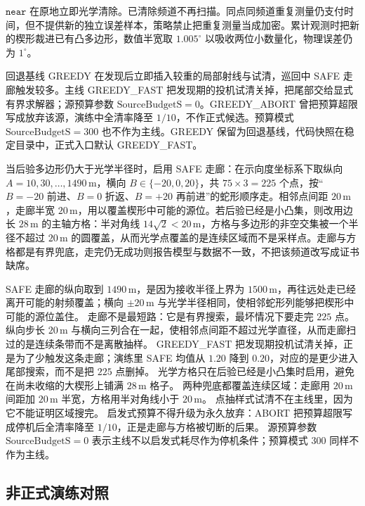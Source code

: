 $\mathtt{near}$ 在原地立即光学清除。已清除频道不再扫描。同点同频道重复测量仍支付时间，但不提供新的独立误差样本，策略禁止把重复测量当成加密。累计观测时把新的楔形裁进已有凸多边形，数值半宽取 $1.005^\circ$ 以吸收两位小数量化，物理误差仍为 $1^\circ$。

回退基线 GREEDY 在发现后立即插入较重的局部射线与试清，巡回中 SAFE 走廊触发较多。主线 GREEDY\_FAST 把发现期的投机试清关掉，把尾部交给显式有界求解器；源预算参数 $\mathrm{SourceBudgetS}=0$。GREEDY\_ABORT 曾把预算超限写成放弃该源，演练中全清率降至 $1/10$，不作正式候选。预算模式 $\mathrm{SourceBudgetS}=300$ 也不作为主线。GREEDY 保留为回退基线，代码快照在稳定目录中，正式入口默认 GREEDY\_FAST。

当后验多边形仍大于光学半径时，启用 SAFE 走廊：在示向度坐标系下取纵向 $A=10,30,\ldots,1490\,\mathrm{m}$，横向 $B\in\{-20,0,20\}$，共 $75\times 3=225$ 个点，按“$B=-20$ 前进、$B=0$ 折返、$B=+20$ 再前进”的蛇形顺序走。相邻点间距 $20\,\mathrm{m}$，走廊半宽 $20\,\mathrm{m}$，用以覆盖楔形中可能的源位。若后验已经是小凸集，则改用边长 $28\,\mathrm{m}$ 的主轴方格：半对角线 $14\sqrt{2}<20\,\mathrm{m}$，方格与多边形的非空交集被一个半径不超过 $20\,\mathrm{m}$ 的圆覆盖，从而光学点覆盖的是连续区域而不是采样点。走廊与方格都是有界兜底，走完仍无成功则报告模型与数据不一致，不把该频道改写成证书缺席。

SAFE 走廊的纵向取到 $1490\,\mathrm{m}$，是因为接收半径上界为 $1500\,\mathrm{m}$，再往远处走已经离开可能的射频覆盖；横向 $\pm 20\,\mathrm{m}$ 与光学半径相同，使相邻蛇形列能够把楔形中可能的源位盖住。
走廊不是最短路：它是有界搜索，最坏情况下要走完 $225$ 点。
纵向步长 $20\,\mathrm{m}$ 与横向三列合在一起，使相邻点间距不超过光学直径，从而走廊扫过的是连续条带而不是离散抽样。
GREEDY\_FAST 把发现期投机试清关掉，正是为了少触发这条走廊；演练里 SAFE 均值从 $1.20$ 降到 $0.20$，对应的是更少进入尾部搜索，而不是把 $225$ 点删掉。
光学方格只在后验已经是小凸集时启用，避免在尚未收缩的大楔形上铺满 $28\,\mathrm{m}$ 格子。
两种兜底都覆盖连续区域：走廊用 $20\,\mathrm{m}$ 间距加 $20\,\mathrm{m}$ 半宽，方格用半对角线小于 $20\,\mathrm{m}$。
点抽样式试清不在主线里，因为它不能证明区域搜完。
启发式预算不得升级为永久放弃：ABORT 把预算超限写成停机后全清率降至 $1/10$，正是走廊与方格被切断的后果。
源预算参数 $\mathrm{SourceBudgetS}=0$ 表示主线不以启发式耗尽作为停机条件；预算模式 $300$ 同样不作为主线。

\subsection{非正式演练对照}

